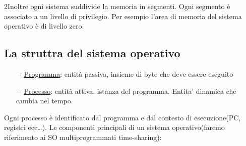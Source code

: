 \documentclass{article}
\begin{document}
\noindent 2Inoltre ogni sistema suddivide la memoria in segmenti. Ogni segmento è associato a un livello 
di privilegio. Per esempio l'area di memoria del sistema operativo è di livello zero.


\subsection{La struttra del sistema operativo}
\begin{itemize}
    \item[$-$] \underline{Programma}: entità passiva, insieme di byte che deve essere eseguito
    \item[$-$] \underline{Processo}: entità attiva, istanza del programma.  Entita' dinamica che cambia nel tempo.
    \item[] 
\end{itemize}

\noindent Ogni processo è identificato dal programma e dal contesto di esecuzione(PC, registri ecc…).
Le componenti principali di un sistema operativo(faremo riferimento ai SO multiprogrammati 
time-sharing):
\end{document}
